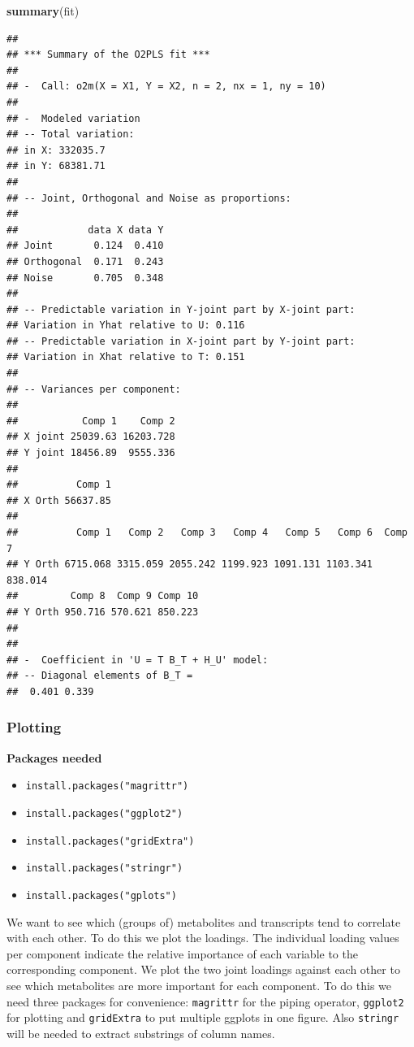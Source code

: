 \documentclass[]{article}
\newenvironment{Shaded}{\begin{snugshade}}{\end{snugshade}}
\newcommand{\KeywordTok}[1]{\textcolor[rgb]{0.13,0.29,0.53}{\textbf{{#1}}}}
\newcommand{\NormalTok}[1]{{#1}}
\providecommand{\tightlist}{%
  \setlength{\itemsep}{0pt}\setlength{\parskip}{0pt}}
\begin{document}
\begin{Shaded}
\begin{Highlighting}[]
\KeywordTok{summary}\NormalTok{(fit)}
\end{Highlighting}
\end{Shaded}

\begin{verbatim}
## 
## *** Summary of the O2PLS fit *** 
## 
## -  Call: o2m(X = X1, Y = X2, n = 2, nx = 1, ny = 10) 
## 
## -  Modeled variation
## -- Total variation:
## in X: 332035.7 
## in Y: 68381.71 
## 
## -- Joint, Orthogonal and Noise as proportions:
## 
##            data X data Y
## Joint       0.124  0.410
## Orthogonal  0.171  0.243
## Noise       0.705  0.348
## 
## -- Predictable variation in Y-joint part by X-joint part:
## Variation in Yhat relative to U: 0.116 
## -- Predictable variation in X-joint part by Y-joint part:
## Variation in Xhat relative to T: 0.151 
## 
## -- Variances per component:
## 
##           Comp 1    Comp 2
## X joint 25039.63 16203.728
## Y joint 18456.89  9555.336
## 
##          Comp 1
## X Orth 56637.85
## 
##          Comp 1   Comp 2   Comp 3   Comp 4   Comp 5   Comp 6  Comp 7
## Y Orth 6715.068 3315.059 2055.242 1199.923 1091.131 1103.341 838.014
##         Comp 8  Comp 9 Comp 10
## Y Orth 950.716 570.621 850.223
## 
## 
## -  Coefficient in 'U = T B_T + H_U' model:
## -- Diagonal elements of B_T =
##  0.401 0.339
\end{verbatim}

\subsubsection{Plotting}\label{plotting}

\textbf{Packages needed}

\begin{itemize}
\tightlist
\item
  \texttt{install.packages("magrittr")}
\item
  \texttt{install.packages("ggplot2")}
\item
  \texttt{install.packages("gridExtra")}
\item
  \texttt{install.packages("stringr")}
\item
  \texttt{install.packages("gplots")}
\end{itemize}

We want to see which (groups of) metabolites and transcripts tend to
correlate with each other. To do this we plot the loadings. The
individual loading values per component indicate the relative importance
of each variable to the corresponding component. We plot the two joint
loadings against each other to see which metabolites are more important
for each component. To do this we need three packages for convenience:
\texttt{magrittr} for the piping operator, \texttt{ggplot2} for plotting
and \texttt{gridExtra} to put multiple ggplots in one figure. Also
\texttt{stringr} will be needed to extract substrings of column names.
\end{document}
